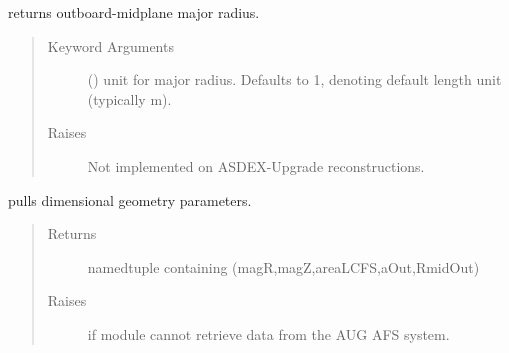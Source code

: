 \documentclass[letterpaper,10pt,english]{sphinxmanual}
\begin{document}
\begin{fulllineitems}
\begin{fulllineitems}
\label{\detokenize{eqtools:eqtools.AUGData.AUGDDData.getRmidOut}}
returns outboard-midplane major radius.
\begin{quote}\begin{description}
\item[{Keyword Arguments}] \leavevmode
{} () \textendash{} unit for major radius.  Defaults to 1,
denoting default length unit (typically m).

\item[{Raises}] \leavevmode
{} \textendash{} Not implemented on ASDEX-Upgrade reconstructions.

\end{description}\end{quote}

\end{fulllineitems}


\begin{fulllineitems}
\label{\detokenize{eqtools:eqtools.AUGData.AUGDDData.getGeometry}}
pulls dimensional geometry parameters.
\begin{quote}\begin{description}
\item[{Returns}] \leavevmode
namedtuple containing (magR,magZ,areaLCFS,aOut,RmidOut)

\item[{Raises}] \leavevmode
{} \textendash{} if module cannot retrieve data from the AUG AFS system.

\end{description}\end{quote}

\end{fulllineitems}



\end{fulllineitems}
\end{document}
